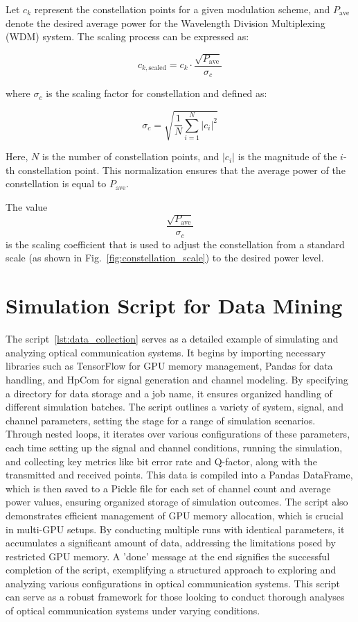 Let $c_k$ represent the constellation points for a given modulation scheme, and $P_{\text{ave}}$ denote the desired average power for the Wavelength Division Multiplexing (WDM) system. The scaling process can be expressed as:

\[
c_{k,\text{scaled}} = c_k \cdot \frac{\sqrt{P_{\text{ave}}}}{\sigma_{c}}
\]

where $\sigma_{c}$ is the scaling factor for constellation and defined as:

\[
\sigma_{c} = \sqrt{\frac{1}{N} \sum_{i=1}^{N} |c_i|^2}
\]

Here, $N$ is the number of constellation points, and $|c_i|$ is the magnitude of the $i$-th constellation point. This normalization ensures that the average power of the constellation is equal to $P_{\text{ave}}$.

The value 
\[
\frac{\sqrt{P_{\text{ave}}}}{\sigma_{c}}
\]
is the scaling coefficient that is used to adjust the constellation from a standard scale (as shown in Fig.~\ref{fig:constellation_scale}) to the desired power level.


\section{Simulation Script for Data Mining}

The script~\ref{lst:data_collection} serves as a detailed example of simulating and analyzing optical communication systems. It begins by importing necessary libraries such as TensorFlow for GPU memory management, Pandas for data handling, and HpCom for signal generation and channel modeling. By specifying a directory for data storage and a job name, it ensures organized handling of different simulation batches. The script outlines a variety of system, signal, and channel parameters, setting the stage for a range of simulation scenarios. Through nested loops, it iterates over various configurations of these parameters, each time setting up the signal and channel conditions, running the simulation, and collecting key metrics like bit error rate and Q-factor, along with the transmitted and received points. This data is compiled into a Pandas DataFrame, which is then saved to a Pickle file for each set of channel count and average power values, ensuring organized storage of simulation outcomes. The script also demonstrates efficient management of GPU memory allocation, which is crucial in multi-GPU setups. By conducting multiple runs with identical parameters, it accumulates a significant amount of data, addressing the limitations posed by restricted GPU memory. A 'done' message at the end signifies the successful completion of the script, exemplifying a structured approach to exploring and analyzing various configurations in optical communication systems. This script can serve as a robust framework for those looking to conduct thorough analyses of optical communication systems under varying conditions.

